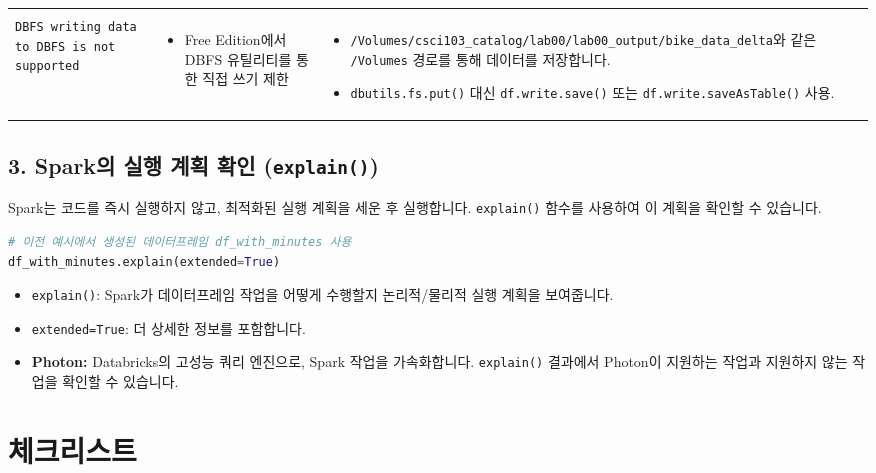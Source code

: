 \documentclass[11pt,a4paper]{article}
\theoremstyle{definition}
\begin{document}
\begin{itemize}
\begin{adjustbox}{max width=\textwidth}
\begin{tabular}{lll}
\begin{itemize}
\begin{itemize}
\end{itemize} \\
\texttt{DBFS writing data to DBFS is not supported} &
\begin{itemize}
    \item Free Edition에서 DBFS 유틸리티를 통한 직접 쓰기 제한
\end{itemize} &
\begin{itemize}
    \item \texttt{/Volumes/csci103_catalog/lab00/lab00_output/bike_data_delta}와 같은 \texttt{/Volumes} 경로를 통해 데이터를 저장합니다.
    \item \texttt{dbutils.fs.put()} 대신 \texttt{df.write.save()} 또는 \texttt{df.write.saveAsTable()} 사용.
\end{itemize} \\
\bottomrule
\end{tabular}
\end{adjustbox}

\subsection*{3. Spark의 실행 계획 확인 (\texttt{explain()})}

Spark는 코드를 즉시 실행하지 않고, 최적화된 실행 계획을 세운 후 실행합니다. \texttt{explain()} 함수를 사용하여 이 계획을 확인할 수 있습니다.

\begin{lstlisting}[language=python, caption={Spark 실행 계획 확인 예시}, label={lst:spark_explain}]
# 이전 예시에서 생성된 데이터프레임 df_with_minutes 사용
df_with_minutes.explain(extended=True)
\end{lstlisting}
\begin{itemize}
    \item \texttt{explain()}: Spark가 데이터프레임 작업을 어떻게 수행할지 논리적/물리적 실행 계획을 보여줍니다.
    \item \texttt{extended=True}: 더 상세한 정보를 포함합니다.
    \item \textbf{Photon:} Databricks의 고성능 쿼리 엔진으로, Spark 작업을 가속화합니다. \texttt{explain()} 결과에서 Photon이 지원하는 작업과 지원하지 않는 작업을 확인할 수 있습니다.
\end{itemize}

\newpage

\section*{체크리스트}


\end{itemize}
\end{document}
